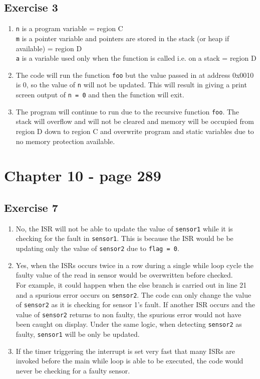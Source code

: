 \documentclass[11pt]{article}
\begin{document}
\subsection*{Exercise 3}
\begin{enumerate}[label=\alph*)]
    \item %
    \texttt{n} is a program variable = region C\\ 
    \texttt{m} is a pointer variable and pointers are stored in the stack (or heap if available) = region D\\ 
    \texttt{a} is a variable used only when the function is called i.e. on a stack = region D
    \item %
    The code will run the function \texttt{foo} but the value passed in at address 0x0010 is 0, so the value of \texttt{n} will not be updated. This will result in giving a print screen output of \texttt{n = 0} and then the function will exit.
    \item %
    The program will continue to run due to the recursive function \texttt{foo}. The stack will overflow and will not be cleared and memory will be occupied from region D down to region C and overwrite program and static variables due to no memory protection available.
\end{enumerate}

\newpage 
\section*{Chapter 10 - page 289}
\subsection*{Exercise 7}
\begin{enumerate}[label=\alph*)]
    \item %
    No, the ISR will not be able to update the value of \texttt{sensor1} while it is checking for the fault in \texttt{sensor1}. This is because the ISR would be be updating only the value of \texttt{sensor2} due to \texttt{flag = 0}.
    \item %
    Yes, when the ISRs occurs twice in a row during a single while loop cycle the faulty value of the read in sensor would be overwritten before checked.\\ 
    For example, it could happen when the else branch is carried out in line 21 and a spurious error occurs on \texttt{sensor2}. The code can only change the value of \texttt{sensor2} as it is checking for sensor 1's fault. If another ISR occurs and the value of \texttt{sensor2} returns to non faulty, the spurious error would not have been caught on display. Under the same logic, when detecting \texttt{sensor2} as faulty, \texttt{sensor1} will be only be updated.
    \item %
    If the timer triggering the interrupt is set very fast that many ISRs are invoked before the main while loop is able to be executed, the code would never be checking for a faulty sensor.
\end{enumerate}
\end{document}
